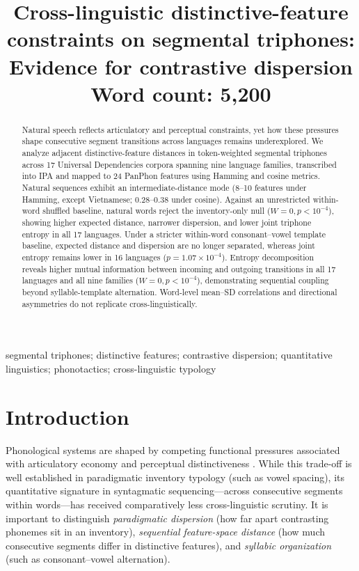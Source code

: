 \documentclass[cm]{glossa}
\title[Cross-linguistic distinctive-feature constraints]{Cross-linguistic distinctive-feature constraints on segmental triphones: Evidence for contrastive dispersion\\ \bigskip \large Word count: 5,200}
\author[]{}
\begin{document}
\maketitle

\begin{abstract}
Natural speech reflects articulatory and perceptual constraints, yet how these pressures shape consecutive segment transitions across languages remains underexplored. We analyze adjacent distinctive-feature distances in token-weighted segmental triphones across 17 Universal Dependencies corpora spanning nine language families, transcribed into IPA and mapped to 24 PanPhon features using Hamming and cosine metrics. Natural sequences exhibit an intermediate-distance mode (8--10 features under Hamming, except Vietnamese; 0.28--0.38 under cosine). Against an unrestricted within-word shuffled baseline, natural words reject the inventory-only null ($W=0, p < 10^{-4}$), showing higher expected distance, narrower dispersion, and lower joint triphone entropy in all 17 languages. Under a stricter within-word consonant--vowel template baseline, expected distance and dispersion are no longer separated, whereas joint entropy remains lower in 16 languages ($p = 1.07 \times 10^{-4}$). Entropy decomposition reveals higher mutual information between incoming and outgoing transitions in all 17 languages and all nine families ($W=0, p < 10^{-4}$), demonstrating sequential coupling beyond syllable-template alternation. Word-level mean--SD correlations and directional asymmetries do not replicate cross-linguistically.
\end{abstract}

\begin{keywords}
segmental triphones; distinctive features; contrastive dispersion; quantitative linguistics; phonotactics; cross-linguistic typology
\end{keywords}

\section{Introduction}
Phonological systems are shaped by competing functional pressures associated with articulatory economy and perceptual distinctiveness \citep{zipf1949,lindblom1990,flemming2004}. While this trade-off is well established in paradigmatic inventory typology (such as vowel spacing), its quantitative signature in syntagmatic sequencing---across consecutive segments within words---has received comparatively less cross-linguistic scrutiny. It is important to distinguish \emph{paradigmatic dispersion} (how far apart contrasting phonemes sit in an inventory), \emph{sequential feature-space distance} (how much consecutive segments differ in distinctive features), and \emph{syllabic organization} (such as consonant--vowel alternation).
\end{document}

